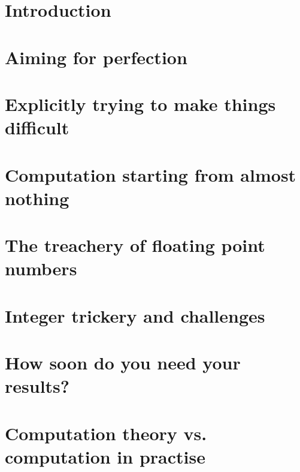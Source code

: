 
\chapter{Introduction}


\chapter{Aiming for perfection}

\chapter{Explicitly trying to make things difficult}



\chapter{Computation starting from almost nothing}


\chapter{The treachery of floating point numbers}

\chapter{Integer trickery and challenges}

\chapter{How soon do you need your results?}






\chapter{Computation theory vs. computation in practise}






